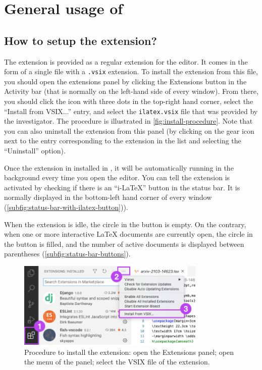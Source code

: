 \section{General usage of \iLaTeX{}}

\subsection{How to setup the \iLaTeX{} extension?}
The \iLaTeX{} extension is provided as a regular extension for the \vsc editor.
It comes in the form of a single file with a \texttt{.vsix} extension.
To install the extension from this file, you should open the extensions panel by clicking the Extensions button in the Activity bar (that is normally on the left-hand side of every \vsc window). From there, you should click the icon with three dots in the top-right hand corner, select the ``Install from VSIX...'' entry, and select the \texttt{ilatex.vsix} file that was provided by the investigator.
The procedure is illustrated in \autoref{fig:install-procedure}.
Note that you can also uninstall the extension from this panel (by clicking on the gear icon next to the entry corresponding to the \iLaTeX{} extension in the list and selecting the ``Uninstall'' option).

Once the \iLaTeX{} extension in installed in \vsc, it will be automatically running in the background every time you open the editor.
You can tell the \iLaTeX{} extension is activated by checking if there is an ``i-LaTeX'' button in the status bar.
It is normally displayed in the bottom-left hand corner of every \vsc window (\autoref{subfig:status-bar-with-ilatex-button})).

When the extension is idle, the circle in the button is empty.
On the contrary, when one or more interactive \LaTeX{} documents are currently open, the circle in the button is filled, and the number of active documents is displayed between parentheses (\autoref{subfig:status-bar-buttons}).

\begin{figure}[b!]
    \centering
    \includegraphics[width=0.8\textwidth]{img/installation-procedure.png}
    \caption{Procedure to install the \iLaTeX{} extension:  open the Extensions panel;  open the menu of the panel;  select the VSIX file of the extension.}
    \label{fig:install-procedure}
\end{figure}

